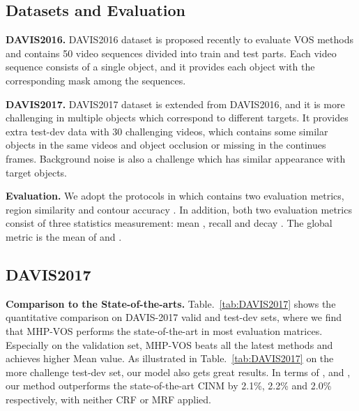 \documentclass[10pt,twocolumn,letterpaper]{article}
\begin{document}
\subsection{Datasets and Evaluation}
\vspace{-5pt}

\textbf{DAVIS2016.} DAVIS2016 \cite{perazzi2016benchmark} dataset is proposed recently to evaluate VOS methods and contains 50 video sequences divided into train and test parts. Each video sequence consists of a single object, and it provides each object with the corresponding mask among the sequences. 

\textbf{DAVIS2017.} DAVIS2017 \cite{Pont-Tuset_arXiv_2017} dataset is extended from DAVIS2016, and it is more challenging in multiple objects which correspond to different targets. It provides extra test-dev data with 30 challenging videos, which contains some similar objects in the same videos and object occlusion or missing in the continues frames. Background noise is also a challenge which has similar appearance with target objects.

\textbf{Evaluation.} We adopt the protocols in \cite{perazzi2016benchmark} which contains two evaluation metrics, region similarity  and contour accuracy . 
In addition, both two evaluation metrics consist of three statistics measurement: mean , recall  and decay . The global metric  is the mean of  and .









\vspace{-5pt}
\subsection{DAVIS2017} 
\vspace{-5pt}












\textbf{Comparison to the State-of-the-arts.}
Table.~\ref{tab:DAVIS2017} shows the quantitative comparison on DAVIS-2017 valid and test-dev sets, where we find that MHP-VOS performs the state-of-the-art in most evaluation matrices. Especially on the validation set, MHP-VOS beats all the latest methods and achieves higher Mean value. As illustrated in Table.~\ref{tab:DAVIS2017} on the more challenge test-dev set, our model also gets great results. In terms of ,  and , our method outperforms the state-of-the-art CINM \cite{bao2018cnn} by 2.1\%, 2.2\% and 2.0\% respectively, with neither CRF or MRF applied. 
\end{document}
